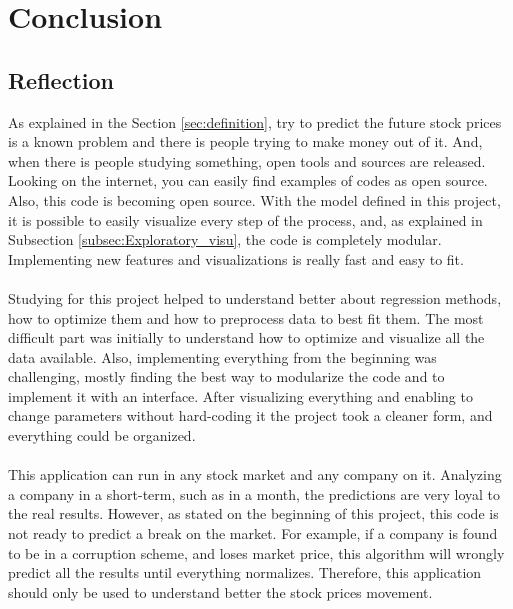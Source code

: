 \section{Conclusion}
\label{sec:conclusion}




\subsection{Reflection}
As explained in the Section \ref{sec:definition}, try to predict the future stock prices is a known problem and there is people trying to make money out of it. And, when there is people 
studying something, open tools and sources are released. Looking on the internet, you can easily find examples of codes as open source. Also, this code is becoming open source.
With the model defined in this project, it is possible to easily visualize every step of the process, and, as explained in Subsection \ref{subsec:Exploratory_visu}, the code is completely modular.
Implementing new features and visualizations is really fast and easy to fit.\\
\\
Studying for this project helped to understand better about regression methods, how to optimize them and how to preprocess data to best fit them. The most difficult part was initially to understand
how to optimize and visualize all the data available. Also, implementing everything from the beginning was challenging, mostly finding the best way to modularize the code and to implement it with 
an interface. After visualizing everything and enabling to change parameters without hard-coding it the project took a cleaner form, and everything could be organized.\\
\\
This application can run in any stock market and any company on it. Analyzing a company in a short-term, such as in a month, the predictions are very loyal to the real results. However, as stated on
the beginning of this project, this code is not ready to predict a break on the market. For example, if a company is found to be in a corruption scheme, and loses market price, this algorithm will 
wrongly predict all the results until everything normalizes. Therefore, this application should only be used to understand better the stock prices movement. 

